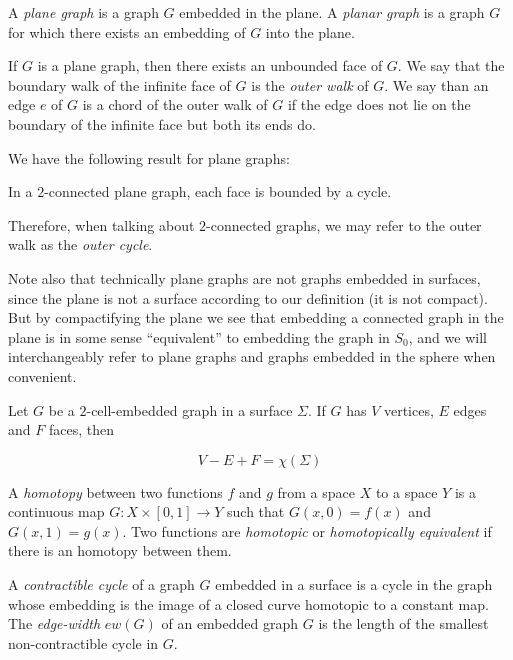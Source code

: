 \begin{definition}
A \emph{plane graph} is a graph $G$ embedded in the plane. A \emph{planar graph} is a graph $G$ for which there exists an embedding of $G$ into the plane. 

If $G$ is a plane graph, then there exists an unbounded face of $G$. We say 
that the boundary walk of the infinite face of $G$ is the \emph{outer walk} of $G$. We say
than an edge $e$ of $G$ is a chord of the outer walk of $G$ if the edge does not lie on the
boundary of the infinite face but both its ends do. 
\end{definition}

We have the following result for plane graphs:

\begin{theorem}
In a $2$-connected plane graph, each face is bounded by a cycle.
\end{theorem}

Therefore, when talking about $2$-connected graphs, we may refer to the outer walk as the 
\emph{outer cycle}.

Note also that technically plane graphs are not graphs embedded in surfaces, since the plane is
not a surface according to our definition (it is not compact). But by compactifying the plane
we see that embedding a connected graph in the plane is in some sense ``equivalent'' to embedding 
the graph in $S_0$, and we will interchangeably refer to plane graphs and graphs embedded in the 
sphere when convenient. 

\begin{theorem}
Let $G$ be a $2$-cell-embedded graph in a surface $\Sigma$. If $G$ has $V$ vertices, $E$ edges and 
$F$ faces, then

\[
V - E + F = \chi(\Sigma)
\]
\end{theorem}

\begin{definition}
A \emph{homotopy} between two functions $f$ and $g$ from a space $X$ to a space $Y$ is a continuous
map $G : X \times [0, 1] \rightarrow Y$ such that $G(x, 0) = f(x)$ and $G(x, 1) = g(x)$. 
Two functions are \emph{homotopic} or \emph{homotopically equivalent} if there is an homotopy
between them. 
\end{definition}

\begin{definition}
A \emph{contractible cycle} of a graph $G$ embedded in a surface is a cycle in the graph whose 
embedding is the image of a closed curve homotopic to a constant map.
The \emph{edge-width} $ew(G)$ of an embedded graph $G$ 
is the length of the smallest non-contractible cycle in $G$. 
\end{definition}





